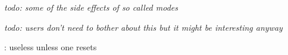 {\em todo: some of the side effects of so called modes}

\stopsection

\startsection[title=Normalization]

{\em todo: users don't need to bother about this but it might be interesting anyway}

\stopsection

\stopdocument

\everyhbox \everyvbox : useless unless one resets
\parattr
\snapshotpar
\wrapuppar


%
